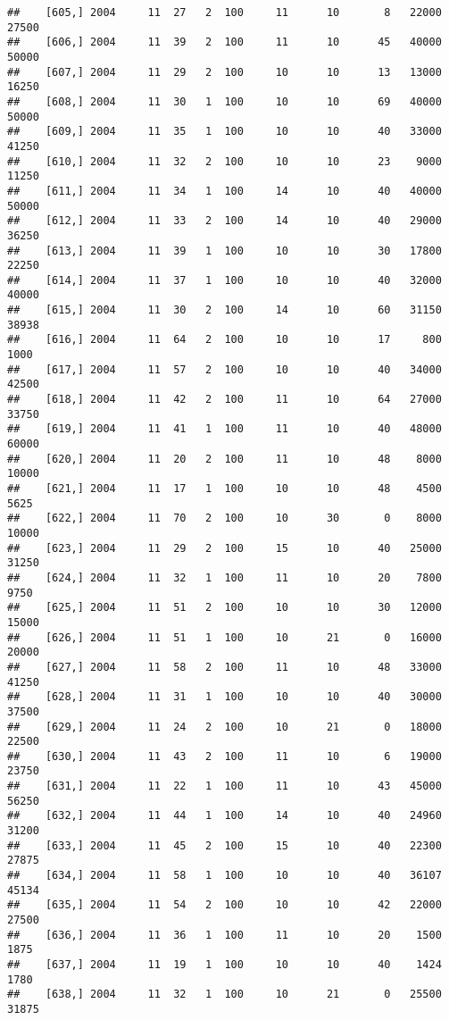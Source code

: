 \documentclass{article}\usepackage[]{graphicx}\usepackage[]{color}
\makeatletter
\newenvironment{kframe}{%
 \def\at@end@of@kframe{}%
 \ifinner\ifhmode%
  \def\at@end@of@kframe{\end{minipage}}%
  \begin{minipage}{\columnwidth}%
 \fi\fi%
 \def\FrameCommand##1{\hskip\@totalleftmargin \hskip-\fboxsep
 \colorbox{shadecolor}{##1}\hskip-\fboxsep
     \hskip-\linewidth \hskip-\@totalleftmargin \hskip\columnwidth}%
 \MakeFramed {\advance\hsize-\width
   \@totalleftmargin\z@ \linewidth\hsize
   \@setminipage}}%
 {\par\unskip\endMakeFramed%
 \at@end@of@kframe}
\newenvironment{knitrout}{}{} %
\makeatother
\begin{document}
\begin{knitrout}
\begin{kframe}
\begin{verbatim}
##    [605,] 2004     11  27   2  100     11      10       8   22000   27500
##    [606,] 2004     11  39   2  100     11      10      45   40000   50000
##    [607,] 2004     11  29   2  100     10      10      13   13000   16250
##    [608,] 2004     11  30   1  100     10      10      69   40000   50000
##    [609,] 2004     11  35   1  100     10      10      40   33000   41250
##    [610,] 2004     11  32   2  100     10      10      23    9000   11250
##    [611,] 2004     11  34   1  100     14      10      40   40000   50000
##    [612,] 2004     11  33   2  100     14      10      40   29000   36250
##    [613,] 2004     11  39   1  100     10      10      30   17800   22250
##    [614,] 2004     11  37   1  100     10      10      40   32000   40000
##    [615,] 2004     11  30   2  100     14      10      60   31150   38938
##    [616,] 2004     11  64   2  100     10      10      17     800    1000
##    [617,] 2004     11  57   2  100     10      10      40   34000   42500
##    [618,] 2004     11  42   2  100     11      10      64   27000   33750
##    [619,] 2004     11  41   1  100     11      10      40   48000   60000
##    [620,] 2004     11  20   2  100     11      10      48    8000   10000
##    [621,] 2004     11  17   1  100     10      10      48    4500    5625
##    [622,] 2004     11  70   2  100     10      30       0    8000   10000
##    [623,] 2004     11  29   2  100     15      10      40   25000   31250
##    [624,] 2004     11  32   1  100     11      10      20    7800    9750
##    [625,] 2004     11  51   2  100     10      10      30   12000   15000
##    [626,] 2004     11  51   1  100     10      21       0   16000   20000
##    [627,] 2004     11  58   2  100     11      10      48   33000   41250
##    [628,] 2004     11  31   1  100     10      10      40   30000   37500
##    [629,] 2004     11  24   2  100     10      21       0   18000   22500
##    [630,] 2004     11  43   2  100     11      10       6   19000   23750
##    [631,] 2004     11  22   1  100     11      10      43   45000   56250
##    [632,] 2004     11  44   1  100     14      10      40   24960   31200
##    [633,] 2004     11  45   2  100     15      10      40   22300   27875
##    [634,] 2004     11  58   1  100     10      10      40   36107   45134
##    [635,] 2004     11  54   2  100     10      10      42   22000   27500
##    [636,] 2004     11  36   1  100     11      10      20    1500    1875
##    [637,] 2004     11  19   1  100     10      10      40    1424    1780
##    [638,] 2004     11  32   1  100     10      21       0   25500   31875

\end{verbatim}
\end{kframe}
\end{knitrout}
\end{document}
